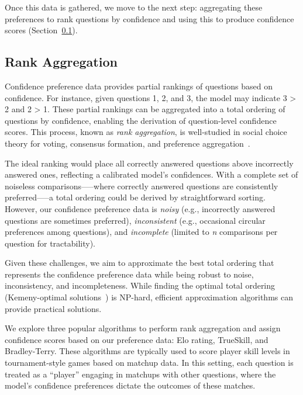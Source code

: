Once this data is gathered, we move to the next step: aggregating these preferences to rank questions by confidence and using this to produce confidence scores (Section~\ref{subsec:rank_aggregation}). 

\subsection{Rank Aggregation}
\label{subsec:rank_aggregation}
Confidence preference data provides partial rankings of questions based on confidence. For instance, given questions 1, 2, and 3, the model may indicate 3 > 2 and 2 > 1. These partial rankings can be aggregated into a total ordering of questions by confidence, enabling the derivation of question-level confidence scores. This process, known as \textit{rank aggregation}, is well-studied in social choice theory for voting, consensus formation, and preference aggregation~\citep{arrow-social-choice, Tideman1987IndependenceOC, kemeny-young, Dwork2001RankAM}.

 The ideal ranking would place all correctly answered questions above incorrectly answered ones, reflecting a calibrated model's confidences. With a complete set of noiseless comparisons--—where correctly answered questions are consistently preferred—--a total ordering could be derived by straightforward sorting. However, our confidence preference data is \textit{noisy} (e.g., incorrectly answered questions are sometimes preferred), \textit{inconsistent} (e.g., occasional circular preferences among questions), and \textit{incomplete} (limited to \textit{n} comparisons per question for tractability).

Given these challenges, we aim to approximate the best total ordering that represents the confidence preference data while being robust to noise, inconsistency, and incompleteness. While finding the optimal total ordering (Kemeny-optimal solutions~\citep{kemeny-young}) is NP-hard, efficient approximation algorithms can provide practical solutions.

We explore three popular algorithms to perform rank aggregation and assign confidence scores based on our preference data: Elo rating, TrueSkill, and Bradley-Terry. These algorithms are typically used to score player skill levels in tournament-style games based on matchup data. 
In this setting, each question is treated as a ``player'' engaging in matchups with other questions, where the model’s confidence preferences dictate the outcomes of these matches.

